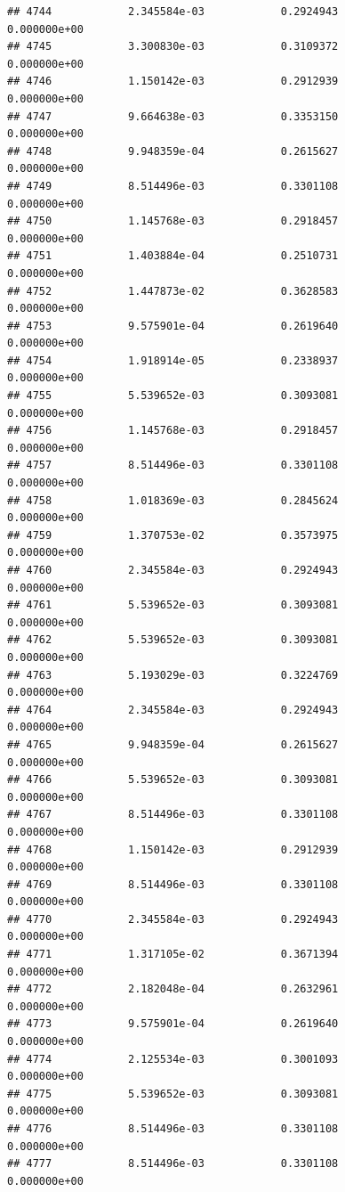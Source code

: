 \documentclass[
]{article}
\begin{document}
\begin{verbatim}
## 4744            2.345584e-03            0.2924943            0.000000e+00
## 4745            3.300830e-03            0.3109372            0.000000e+00
## 4746            1.150142e-03            0.2912939            0.000000e+00
## 4747            9.664638e-03            0.3353150            0.000000e+00
## 4748            9.948359e-04            0.2615627            0.000000e+00
## 4749            8.514496e-03            0.3301108            0.000000e+00
## 4750            1.145768e-03            0.2918457            0.000000e+00
## 4751            1.403884e-04            0.2510731            0.000000e+00
## 4752            1.447873e-02            0.3628583            0.000000e+00
## 4753            9.575901e-04            0.2619640            0.000000e+00
## 4754            1.918914e-05            0.2338937            0.000000e+00
## 4755            5.539652e-03            0.3093081            0.000000e+00
## 4756            1.145768e-03            0.2918457            0.000000e+00
## 4757            8.514496e-03            0.3301108            0.000000e+00
## 4758            1.018369e-03            0.2845624            0.000000e+00
## 4759            1.370753e-02            0.3573975            0.000000e+00
## 4760            2.345584e-03            0.2924943            0.000000e+00
## 4761            5.539652e-03            0.3093081            0.000000e+00
## 4762            5.539652e-03            0.3093081            0.000000e+00
## 4763            5.193029e-03            0.3224769            0.000000e+00
## 4764            2.345584e-03            0.2924943            0.000000e+00
## 4765            9.948359e-04            0.2615627            0.000000e+00
## 4766            5.539652e-03            0.3093081            0.000000e+00
## 4767            8.514496e-03            0.3301108            0.000000e+00
## 4768            1.150142e-03            0.2912939            0.000000e+00
## 4769            8.514496e-03            0.3301108            0.000000e+00
## 4770            2.345584e-03            0.2924943            0.000000e+00
## 4771            1.317105e-02            0.3671394            0.000000e+00
## 4772            2.182048e-04            0.2632961            0.000000e+00
## 4773            9.575901e-04            0.2619640            0.000000e+00
## 4774            2.125534e-03            0.3001093            0.000000e+00
## 4775            5.539652e-03            0.3093081            0.000000e+00
## 4776            8.514496e-03            0.3301108            0.000000e+00
## 4777            8.514496e-03            0.3301108            0.000000e+00

\end{verbatim}
\end{document}

